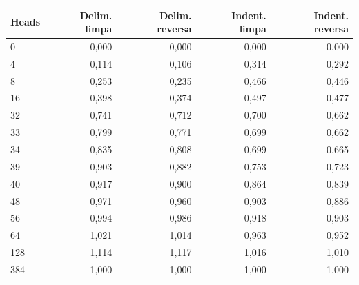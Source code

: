 \begin{tabular}{lrrrr}
\toprule
Heads & Delim. limpa & Delim. reversa & Indent. limpa & Indent. reversa \\
\midrule
0 & 0,000 & 0,000 & 0,000 & 0,000 \\
4 & 0,114 & 0,106 & 0,314 & 0,292 \\
8 & 0,253 & 0,235 & 0,466 & 0,446 \\
16 & 0,398 & 0,374 & 0,497 & 0,477 \\
32 & 0,741 & 0,712 & 0,700 & 0,662 \\
33 & 0,799 & 0,771 & 0,699 & 0,662 \\
34 & 0,835 & 0,808 & 0,699 & 0,665 \\
39 & 0,903 & 0,882 & 0,753 & 0,723 \\
40 & 0,917 & 0,900 & 0,864 & 0,839 \\
48 & 0,971 & 0,960 & 0,903 & 0,886 \\
56 & 0,994 & 0,986 & 0,918 & 0,903 \\
64 & 1,021 & 1,014 & 0,963 & 0,952 \\
128 & 1,114 & 1,117 & 1,016 & 1,010 \\
384 & 1,000 & 1,000 & 1,000 & 1,000 \\
\bottomrule
\end{tabular}
